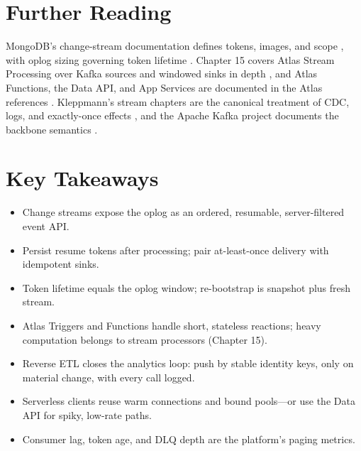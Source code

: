 \section{Further Reading}
MongoDB's change-stream documentation defines tokens, images, and scope \cite{mongodbChangeStreamsDocs}, with oplog sizing governing token lifetime \cite{mongodbOplogDocs}. Chapter 15 covers Atlas Stream Processing over Kafka sources and windowed sinks in depth \cite{mongodbStreamProcessingDocs}, and Atlas Functions, the Data API, and App Services are documented in the Atlas references \cite{mongodbAtlasMonitoringDocs}. Kleppmann's stream chapters are the canonical treatment of CDC, logs, and exactly-once effects \cite{kleppmann2017ddia}, and the Apache Kafka project documents the backbone semantics \cite{apacheKafkaRepo}.

\section*{Key Takeaways}
\begin{itemize}
    \item Change streams expose the oplog as an ordered, resumable, server-filtered event API.
    \item Persist resume tokens after processing; pair at-least-once delivery with idempotent sinks.
    \item Token lifetime equals the oplog window; re-bootstrap is snapshot plus fresh stream.
    \item Atlas Triggers and Functions handle short, stateless reactions; heavy computation belongs to stream processors (Chapter 15).
    \item Reverse ETL closes the analytics loop: push by stable identity keys, only on material change, with every call logged.
    \item Serverless clients reuse warm connections and bound pools---or use the Data API for spiky, low-rate paths.
    \item Consumer lag, token age, and DLQ depth are the platform's paging metrics.
\end{itemize}

